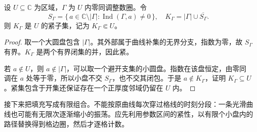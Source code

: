 \begin{lemma}[非零指数的紧填充]\label{b3:lem:10-compact-filling}
设 \(U\subseteq\mathbb C\) 为区域，\(\Gamma\) 为 \(U\) 内零同调整数圈。令
\[
 S_\Gamma=\{\,a\in\mathbb C\setminus|\Gamma|:
                 \operatorname{Ind}(\Gamma,a)\ne0\,\},
 \quad K_\Gamma=|\Gamma|\cup\overline{S_\Gamma}.
\]
则 \(K_\Gamma\) 是 \(U\) 的紧子集，记为 \(K_\Gamma\Subset U\)。
\end{lemma}
\begin{proof}
取一个大圆盘包含 \(|\Gamma|\)。其外部属于曲线补集的无界分支，指数为零，故 \(S_\Gamma\) 有界。\(K_\Gamma\) 是两个有界闭集的并，因此紧。

若 \(a\notin U\)，则 \(a\notin|\Gamma|\)，可以取一个避开支集的小圆盘。指数在该盘恒定，由零同调在 \(a\) 处等于零，所以小盘不交 \(S_\Gamma\)，也不交其闭包。于是 \(a\notin K_\Gamma\)，证明 \(K_\Gamma\subseteq U\)。紧集包含于开集还保证存在一个正厚度邻域仍留在 \(U\) 内。
\end{proof}

接下来把填充写成有限组合。不能按原曲线每次穿过格线的时刻分段：一条光滑曲线也可能有无限次逐渐缩小的振荡。应先利用参数区间的紧性，以有限个小盘内的路径替换得到格边圈，然后才逐格计数。

